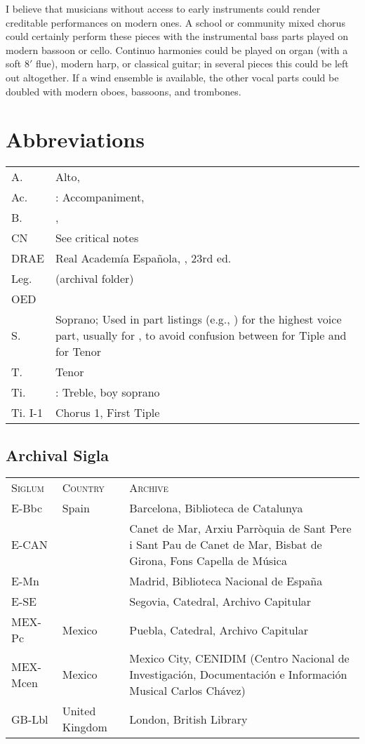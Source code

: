 I believe that musicians without access to early instruments could render creditable performances on modern ones.
A school or community mixed chorus could certainly perform these pieces with the instrumental bass parts played on modern bassoon or cello.
Continuo harmonies could be played on organ (with a soft 8$'$ flue), modern harp, or classical guitar; in several pieces this could be left out altogether.
If a wind ensemble is available, the other vocal parts could be doubled with modern oboes, bassoons, and trombones.


\section{Abbreviations}

\begin{tabu} to \textwidth{lZ}
A. & Alto, \\
Ac. & : Accompaniment, \\
B. & , \\
CN & See critical notes\\
DRAE & Real Academía Española, , 23rd ed.\\
Leg. &  (archival folder)\\
OED & \\
S. & Soprano; Used in part listings (e.g., ) for the highest voice part, usually for , to avoid confusion between  for Tiple and  for Tenor\\
T. & Tenor\\
Ti. & : Treble, boy soprano\\
Ti. I-1 & Chorus 1, First Tiple\\
\end{tabu}

\subsection{Archival Sigla}

\begin{tabu} to \textwidth{llZ}
\textsc{Siglum} & \textsc{Country} & \textsc{Archive}\\
E-Bbc & Spain & Barcelona, Biblioteca de Catalunya\\
E-CAN &  & Canet de Mar, Arxiu Parròquia de Sant Pere i Sant Pau de Canet de Mar, Bisbat de Girona, Fons Capella de Música\\
E-Mn & &  Madrid, Biblioteca Nacional de España\\
E-SE & & Segovia, Catedral, Archivo Capitular\\
MEX-Pc & Mexico &  Puebla, Catedral, Archivo Capitular\\
MEX-Mcen & Mexico & Mexico City, CENIDIM (Centro Nacional de Investigación, Documentación e Información Musical Carlos Chávez)\\
GB-Lbl & United Kingdom & London, British Library\\
\end{tabu}


